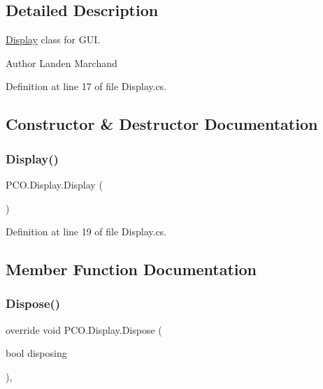 \subsection{Detailed Description}
\hyperlink{classPCO_1_1Display}{Display} class for G\+UI. 

\begin{DoxyAuthor}{Author}
Landen Marchand 
\end{DoxyAuthor}


Definition at line 17 of file Display.\+cs.



\subsection{Constructor \& Destructor Documentation}
\mbox{\label{classPCO_1_1Display_a7c80a0fdb334c85d8226c1be9a8799e7}} 
\subsubsection{\texorpdfstring{Display()}{Display()}}
{\footnotesize\ttfamily P\+C\+O.\+Display.\+Display (\begin{DoxyParamCaption}{ }\end{DoxyParamCaption})\hspace{0.3cm}{\ttfamily [inline]}}



Definition at line 19 of file Display.\+cs.



\subsection{Member Function Documentation}
\mbox{\label{classPCO_1_1Display_a01f3f84c5b2a2aa6ff247840d1b0e409}} 
\subsubsection{\texorpdfstring{Dispose()}{Dispose()}}
{\footnotesize\ttfamily override void P\+C\+O.\+Display.\+Dispose (\begin{DoxyParamCaption}\item[{bool}]{disposing }\end{DoxyParamCaption})\hspace{0.3cm}{\ttfamily [inline]}, {\ttfamily [protected]}}



